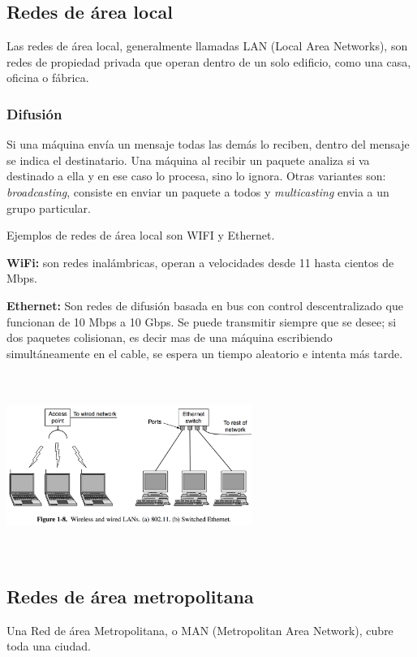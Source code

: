 \documentclass[10pt,a4paper]{report}
\begin{document}
\subsection{Redes de área local}
\par Las redes de área local, generalmente llamadas LAN (Local Area Networks), son 
redes de propiedad privada que operan dentro de un solo edificio, como una casa, 
oficina o fábrica.

\subsubsection{Difusión}
\par Si una máquina envía un mensaje todas las demás lo reciben, dentro del mensaje 
se indica el destinatario. Una máquina al recibir un paquete analiza si va destinado a 
ella y en ese caso lo procesa, sino lo ignora. Otras variantes son: \textit{broadcasting}, 
consiste en enviar un paquete a todos y \textit{multicasting} envia a un grupo 
particular.
\par Ejemplos de redes de área local son WIFI y Ethernet.

\textbf{WiFi:} son redes inalámbricas, operan a velocidades desde 11 hasta cientos de 
Mbps.

\textbf{Ethernet:} Son redes de difusión basada en bus con control descentralizado 
que funcionan de 10 Mbps a 10 Gbps. Se puede transmitir siempre que se desee; si 
dos paquetes colisionan, es decir mas de una máquina escribiendo simultáneamente en 
el cable, se espera un tiempo aleatorio e intenta más tarde.

\begin{center} 
	\includegraphics[width=8cm, height=6cm]{./imagenes/arealocal.png} 
\end{center}

\subsection{Redes de área metropolitana}
\par Una Red de área Metropolitana, o MAN (Metropolitan Area Network), cubre toda 
una ciudad.
\end{document}
